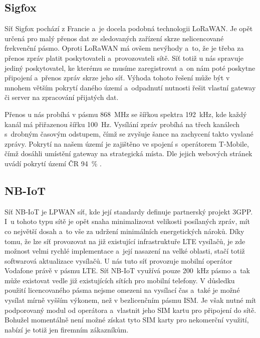 \subsection{Sigfox}

Síť Sigfox pochází z Francie a~je docela podobná technologii LoRaWAN. Je opět určená pro malý přenos dat ze sledovaných zařízení skrze nelicencované frekvenční pásmo. Oproti LoRaWAN má ovšem nevýhody a~to, že je třeba za přenos zpráv platit poskytovateli a~provozovateli sítě. Síť totiž u nás spravuje jediný poskytovatel, ke kterému se musíme zaregistrovat a~on nám poté poskytne připojení a~přenos zpráv skrze jeho síť. Výhoda tohoto řešení může být v mnohem větším pokrytí daného území a~odpadnutí nutnosti řešit vlastní gateway či server na zpracování přijatých dat.

Přenos u nás probíhá v pásmu \SI{868}{\mega\hertz} se šířkou spektra \SI{192}{\kilo\hertz}, kde každý kanál má přiřazenou šířku \SI{100}{\hertz}. Vysílání zpráv probíhá na třech kanálech s~drobným časovým odstupem, čímž se zvyšuje šance na zachycení takto vyslané zprávy. Pokrytí na našem území je zajištěno ve spojení s~operátorem T-Mobile, čímž dosáhli umístění gateway na strategická místa. Dle jejich webových stránek uvádí pokrytí území ČR \SI{94}{\percent} \cite{Sigfox_pokryti}.

\subsection{NB-IoT}

Síť NB-IoT je LPWAN síť, kde její standardy definuje partnerský projekt 3GPP\cite{3GPP}. I~u tohoto typu sítě je opět snaha minimalizovat velikosti posílaných zpráv, mít co největší dosah a~to vše za udržení minimálních energetických nároků. Díky tomu, že lze síť provozovat na již existující infrastruktuře LTE vysílačů, je zde možnost velmi rychlé implementace a~její nasazení na velké oblasti, stačí totiž softwarová aktualizace vysílačů. U nás tuto síť provozuje mobilní operátor Vodafone právě v pásmu LTE. Síť NB-IoT využívá pouze \SI{200}{\kilo\hertz} pásmo a~tak může existovat vedle již existujících sítích pro mobilní telefony. V důsledku použití licencovaného pásma nejsme omezeni na vysílací čas a~také je možné vysílat mírně vyšším výkonem, než v bezlicenčním pásmu ISM. Je však nutné mít podporovaný modul od operátora a~vlastnit jeho SIM kartu pro připojení do sítě. Bohužel momentálně není možné získat tyto SIM karty pro nekomerční využití, nabízí je totiž jen firemním zákazníkům. 


